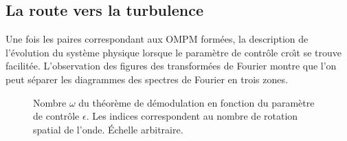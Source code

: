 \documentclass{book}
\newtheorem{rem}{Remarque}[chapter]
\begin{document}
\subsection{La route vers la turbulence}\label{sectionlaroute}
Une fois les paires correspondant aux OMPM form\'ees, la description de
l'\'evolution du syst\`eme physique lorsque le param\`etre de
contr\^ole cro\^\i t
se trouve facilit\'ee.
\def\caca{\begin{rem}
Nous n'avons jamais calcul\'e les nombres $k$ et $\omega$ du
th\'eor\`eme \ref{theokey}
relatifs aux donn\'ees exp\'erimentales. Toutefois le nombre de
rotation\index{nombre de rotation} 
$k$ peut s'obtenir par l'observation directe des structures spatiales
telles qu'elles sont repr\'esent\'ees dans la figure
Fig.\ref{figstructures}. 
Par ailleurs, un ordre de grandeur du nombre $\omega$ peut \^etre obtenu
en recherchant la fr\'equence qui, dans le spectre de Fourier des
chronos de l'onde, correspond \`a un maximum.
\end{rem}}
L'observation des figures des transform\'ees de Fourier montre que l'on
peut  s\'eparer les diagrammes des spectres de Fourier en trois zones.
\begin{figure}[htb]
 \centerline{}   
 \caption{Nombre $\omega$ du th\'eor\`eme de d\'emodulation en fonction du
param\`etre de contr\^ole  $\epsilon$. Les indices correspondent au nombre
de rotation spatial de l'onde. \'Echelle arbitraire.}
 \label{freq}
\end{figure}
%
%
\end{document}
